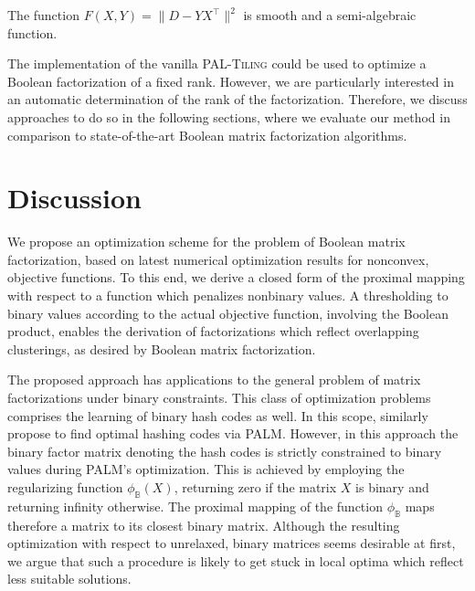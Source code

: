 \begin{corollary}
The function $F(X,Y)=\lVert D-YX^\top\rVert ^2$ is smooth and a semi-algebraic function.
\end{corollary}
The implementation of the vanilla \textsc{PAL-Tiling} could be used to optimize a Boolean factorization of a fixed rank. However, we are particularly interested in an automatic determination of the rank of the factorization. Therefore, we discuss approaches to do so in the following sections, where we evaluate our method in comparison to state-of-the-art Boolean matrix factorization algorithms. 
\section{Discussion}
We propose an optimization scheme for the problem of Boolean matrix factorization, based on latest numerical optimization results for nonconvex, objective functions. To this end, we derive a closed form of the proximal mapping with respect to a function which penalizes nonbinary values. A thresholding to binary values according to the actual objective function, involving the Boolean product, enables the derivation of factorizations which reflect overlapping clusterings, as desired by Boolean matrix factorization.

The proposed approach has applications to the general problem of matrix factorizations under binary constraints. This class of optimization problems comprises the learning of binary hash codes as well. In this scope, \cite{shen2016fast} similarly propose to find optimal hashing codes via PALM. However, in this approach the binary factor matrix denoting the hash codes is strictly constrained to binary values during PALM's optimization. This is achieved by employing the regularizing function $\phi_\mathbb{B}(X)$, returning zero if the matrix $X$ is binary and returning infinity otherwise. The proximal mapping of the function $\phi_\mathbb{B}$ maps therefore a matrix to its closest binary matrix. Although the resulting optimization with respect to unrelaxed, binary matrices seems desirable at first, we argue that such a procedure is likely to get stuck in local optima which reflect less suitable solutions.  